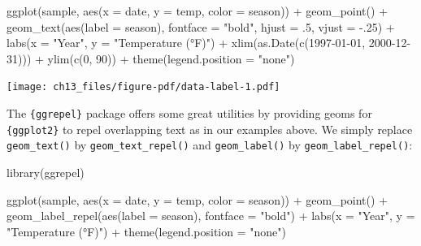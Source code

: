 \documentclass[
  letterpaper,
  DIV=11,
  numbers=noendperiod]{scrreprt}
\newenvironment{Shaded}{\begin{snugshade}}{\end{snugshade}}
\newcommand{\AttributeTok}[1]{\textcolor[rgb]{0.40,0.45,0.13}{#1}}
\newcommand{\DecValTok}[1]{\textcolor[rgb]{0.68,0.00,0.00}{#1}}
\newcommand{\FunctionTok}[1]{\textcolor[rgb]{0.28,0.35,0.67}{#1}}
\newcommand{\NormalTok}[1]{\textcolor[rgb]{0.00,0.23,0.31}{#1}}
\newcommand{\SpecialCharTok}[1]{\textcolor[rgb]{0.37,0.37,0.37}{#1}}
\newcommand{\StringTok}[1]{\textcolor[rgb]{0.13,0.47,0.30}{#1}}
\begin{document}
\begin{Shaded}
\begin{Highlighting}[]
\FunctionTok{ggplot}\NormalTok{(sample, }\FunctionTok{aes}\NormalTok{(}\AttributeTok{x =}\NormalTok{ date, }\AttributeTok{y =}\NormalTok{ temp, }\AttributeTok{color =}\NormalTok{ season)) }\SpecialCharTok{+}
  \FunctionTok{geom\_point}\NormalTok{() }\SpecialCharTok{+}
  \FunctionTok{geom\_text}\NormalTok{(}\FunctionTok{aes}\NormalTok{(}\AttributeTok{label =}\NormalTok{ season), }\AttributeTok{fontface =} \StringTok{"bold"}\NormalTok{,}
            \AttributeTok{hjust =}\NormalTok{ .}\DecValTok{5}\NormalTok{, }\AttributeTok{vjust =} \SpecialCharTok{{-}}\NormalTok{.}\DecValTok{25}\NormalTok{) }\SpecialCharTok{+}
  \FunctionTok{labs}\NormalTok{(}\AttributeTok{x =} \StringTok{"Year"}\NormalTok{, }\AttributeTok{y =} \StringTok{"Temperature (°F)"}\NormalTok{) }\SpecialCharTok{+}
  \FunctionTok{xlim}\NormalTok{(}\FunctionTok{as.Date}\NormalTok{(}\FunctionTok{c}\NormalTok{(}\StringTok{\textquotesingle{}1997{-}01{-}01\textquotesingle{}}\NormalTok{, }\StringTok{\textquotesingle{}2000{-}12{-}31\textquotesingle{}}\NormalTok{))) }\SpecialCharTok{+}
  \FunctionTok{ylim}\NormalTok{(}\FunctionTok{c}\NormalTok{(}\DecValTok{0}\NormalTok{, }\DecValTok{90}\NormalTok{)) }\SpecialCharTok{+}
  \FunctionTok{theme}\NormalTok{(}\AttributeTok{legend.position =} \StringTok{"none"}\NormalTok{)}
\end{Highlighting}
\end{Shaded}

\texttt{[image: ch13\_files/figure-pdf/data-label-1.pdf]}

The \texttt{\{ggrepel\}} package offers some great utilities by
providing geoms for \texttt{\{ggplot2\}} to repel overlapping text as in
our examples above. We simply replace \texttt{geom\_text()} by
\texttt{geom\_text\_repel()} and \texttt{geom\_label()} by
\texttt{geom\_label\_repel()}:

\begin{Shaded}
\begin{Highlighting}[]
\FunctionTok{library}\NormalTok{(ggrepel)}

\FunctionTok{ggplot}\NormalTok{(sample, }\FunctionTok{aes}\NormalTok{(}\AttributeTok{x =}\NormalTok{ date, }\AttributeTok{y =}\NormalTok{ temp, }\AttributeTok{color =}\NormalTok{ season)) }\SpecialCharTok{+}
  \FunctionTok{geom\_point}\NormalTok{() }\SpecialCharTok{+}
  \FunctionTok{geom\_label\_repel}\NormalTok{(}\FunctionTok{aes}\NormalTok{(}\AttributeTok{label =}\NormalTok{ season), }\AttributeTok{fontface =} \StringTok{"bold"}\NormalTok{) }\SpecialCharTok{+}
  \FunctionTok{labs}\NormalTok{(}\AttributeTok{x =} \StringTok{"Year"}\NormalTok{, }\AttributeTok{y =} \StringTok{"Temperature (°F)"}\NormalTok{) }\SpecialCharTok{+}
  \FunctionTok{theme}\NormalTok{(}\AttributeTok{legend.position =} \StringTok{"none"}\NormalTok{)}
\end{Highlighting}
\end{Shaded}
\end{document}
